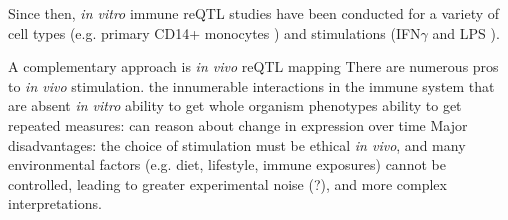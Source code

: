 \begin{outline}
    \2 Since then, \textit{in vitro} immune reQTL studies have been conducted for a variety of 
    cell types
        (e.g. primary CD14+ monocytes \autocite{fairfax2014InnateImmuneActivity}) 
    and stimulations 
    (IFN$\gamma$ and LPS \autocite{fairfax2014InnateImmuneActivity}).


\1 A complementary approach is \textit{in vivo} \gls{reQTL} mapping
    \2 There are numerous pros to \textit{in vivo} stimulation.
        \3 the innumerable interactions in the immune system that are absent \textit{in vitro}
        \3 ability to get whole organism phenotypes
        \3 ability to get repeated measures: can reason about change in expression over time
    \2 Major disadvantages: 
        the choice of stimulation must be ethical \textit{in vivo}, 
        and many environmental factors (e.g. diet, lifestyle, immune exposures) cannot be controlled, leading to greater experimental noise (?), and more complex interpretations.


\end{outline}

